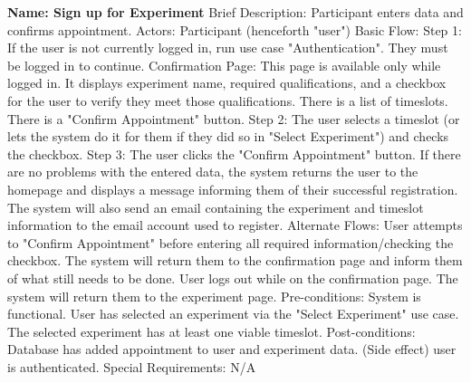 \begin{outline}[enumerate]
\1 {\bf Name: Sign up for Experiment}
\2 Brief Description: Participant enters data and confirms appointment.
\2 Actors: Participant (henceforth "user")
\2 Basic Flow:
\3 Step 1: If the user is not currently logged in, run use case "Authentication".  They must be logged in to continue.
\3 Confirmation Page: This page is available only while logged in.  It displays experiment name, required qualifications, and a checkbox for the user to verify they meet those qualifications. There is a list of timeslots. There is a "Confirm Appointment" button.
\3 Step 2: The user selects a timeslot (or lets the system do it for them if they did so in "Select Experiment") and checks the checkbox.
\3 Step 3: The user clicks the "Confirm Appointment" button.
\3 If there are no problems with the entered data, the system returns the user to the homepage and displays a message informing them of their successful registration.  The system will also send an email containing the experiment and timeslot information to the email account used to register.
\2 Alternate Flows:
\3 User attempts to "Confirm Appointment" before entering all required information/checking the checkbox.
\4 The system will return them to the confirmation page and inform them of what still needs to be done.
\3 User logs out while on the confirmation page.  The system will return them to the experiment page.
\2 Pre-conditions:
\3 System is functional.
\3 User has selected an experiment via the "Select Experiment" use case.
\3 The selected experiment has at least one viable timeslot.
\2 Post-conditions:
\3 Database has added appointment to user and experiment data.
\3 (Side effect) user is authenticated.
\2 Special Requirements:
\3 N/A


\end{outline}
